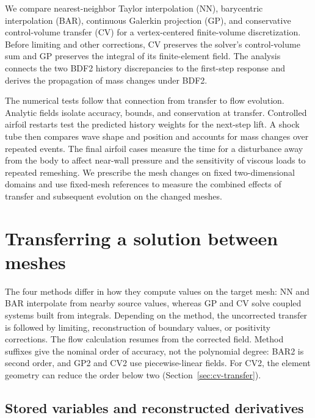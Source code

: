 \documentclass[a4paper,fleqn]{cas-sc}
\begin{document}
We compare nearest-neighbor Taylor interpolation (NN), barycentric interpolation (BAR), continuous Galerkin projection (GP), and conservative control-volume transfer (CV) for a vertex-centered finite-volume discretization. Before limiting and other corrections, CV preserves the solver's control-volume sum and GP preserves the integral of its finite-element field. The analysis connects the two BDF2 history discrepancies to the first-step response and derives the propagation of mass changes under BDF2.

The numerical tests follow that connection from transfer to flow evolution. Analytic fields isolate accuracy, bounds, and conservation at transfer. Controlled airfoil restarts test the predicted history weights for the next-step lift. A shock tube then compares wave shape and position and accounts for mass changes over repeated events. The final airfoil cases measure the time for a disturbance away from the body to affect near-wall pressure and the sensitivity of viscous loads to repeated remeshing. We prescribe the mesh changes on fixed two-dimensional domains and use fixed-mesh references to measure the combined effects of transfer and subsequent evolution on the changed meshes.

\section{Transferring a solution between meshes}
\label{sec:numerical-framework}

The four methods differ in how they compute values on the target mesh: NN and BAR interpolate from nearby source values, whereas GP and CV solve coupled systems built from integrals. Depending on the method, the uncorrected transfer is followed by limiting, reconstruction of boundary values, or positivity corrections. The flow calculation resumes from the corrected field. Method suffixes give the nominal order of accuracy, not the polynomial degree: BAR2 is second order, and GP2 and CV2 use piecewise-linear fields. For CV2, the element geometry can reduce the order below two (Section~\ref{sec:cv-transfer}).

\subsection{Stored variables and reconstructed derivatives}
\label{sec:derivative-reconstruction}
\end{document}
